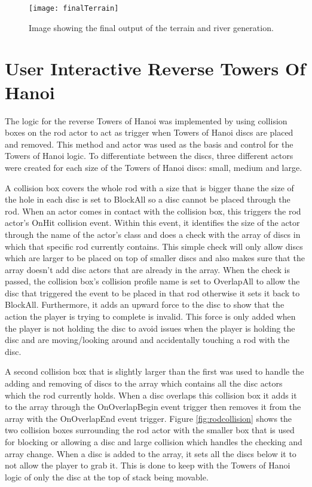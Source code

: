 \begin{figure}[H]
	\texttt{[image: finalTerrain]}
	\centering
	\caption{Image showing the final output of the terrain and river generation.}
	\label{fig:finalTerrain}
\end{figure}


\section{User Interactive Reverse Towers Of Hanoi}
The logic for the reverse Towers of Hanoi was implemented by using collision boxes on the rod actor to act as trigger when Towers of Hanoi discs are placed and removed. This method and actor was used as the basis and control for the Towers of Hanoi logic. To differentiate between the discs, three different actors were created for each size of the Towers of Hanoi discs: small, medium and large. 
\newline
\par
A collision box covers the whole rod with a size that is bigger thane the size of the hole in each disc is set to BlockAll so a disc cannot be placed through the rod. When an actor comes in contact with the collision box, this triggers the rod actor's OnHit collision event. Within this event, it identifies the size of the actor through the name of the actor's class and does a check with the array of discs in which that specific rod currently contains. This simple check will only allow discs which are larger to be placed on top of smaller discs and also makes sure that the array doesn't add disc actors that are already in the array. When the check is passed, the collision box's collision profile name is set to OverlapAll to allow the disc that triggered the event to be placed in that rod otherwise it sets it back to BlockAll. Furthermore, it adds an upward force to the disc to show that the action the player is trying to complete is invalid. This force is only added when the player is not holding the disc to avoid issues when the player is holding the disc and are moving/looking around and accidentally touching a rod with the disc.
\newline
\par
A second collision box that is slightly larger than the first was used to handle the adding and removing of discs to the array which contains all the disc actors which the rod currently holds. When a disc overlaps this collision box it adds it to the array through the OnOverlapBegin event trigger then removes it from the array with the OnOverlapEnd event trigger. Figure \ref{fig:rodcollision} shows the two collision boxes surrounding the rod actor with the smaller box that is used for blocking or allowing a disc and large collision which handles the checking and array change. When a disc is added to the array, it sets all the discs below it to not allow the player to grab it. This is done to keep with the Towers of Hanoi logic of only the disc at the top of stack being movable.

